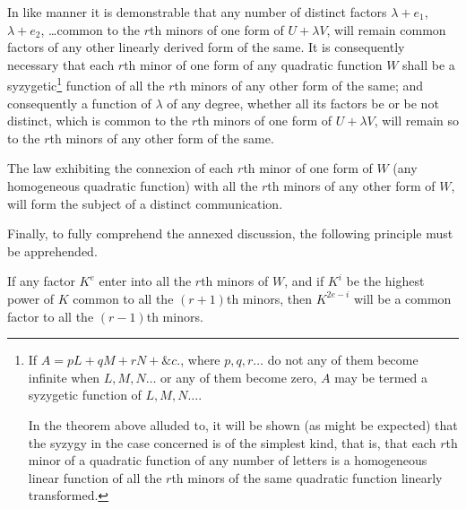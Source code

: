 \documentclass[11pt]{article}
\newcommand{\sourcepage}[1]{\marginpar{\scriptsize p.~#1}}
\begin{document}
{{In like manner it is demonstrable that any number of distinct factors $\lambda+e_1$, $\lambda+e_2$, \ldots common to the $r$th minors of one form of $U+\lambda V$, will remain common factors of any other linearly derived form of the same. It is consequently necessary that each $r$th minor of one form of any quadratic function $W$ shall be a syzygetic\footnote{If $A=pL+qM+rN+\&c.$, where $p,q,r\ldots$ do not any of them become infinite when $L,M,N\ldots$ or any of them become zero, $A$ may be termed a syzygetic function of $L,M,N\ldots$.

In the theorem above alluded to, it will be shown (as might be expected) that the syzygy in the case concerned is of the simplest kind, that is, that each $r$th minor of a quadratic function of any number of letters is a homogeneous linear function of all the $r$th minors of the same quadratic function linearly transformed.} function of all the $r$th minors of any other form of the same; and consequently a function of $\lambda$ of any degree, whether all its factors be or be not distinct, which is common to the $r$th minors of one form of $U+\lambda V$, will remain so to the $r$th minors of any other form of the same.

The law exhibiting the connexion of each $r$th minor of one form of $W$ (any homogeneous quadratic function) with all the $r$th minors of any other form of $W$, will form the subject of a distinct communication.

Finally, to fully comprehend the annexed discussion, the following principle must be apprehended.

\sourcepage{222}
If any factor $K^e$ enter into all the $r$th minors of $W$, and if $K^i$ be the highest power of $K$ common to all the $(r+1)$th minors, then $K^{2e-i}$ will be a common factor to all the $(r-1)$th minors.

}}
\end{document}
